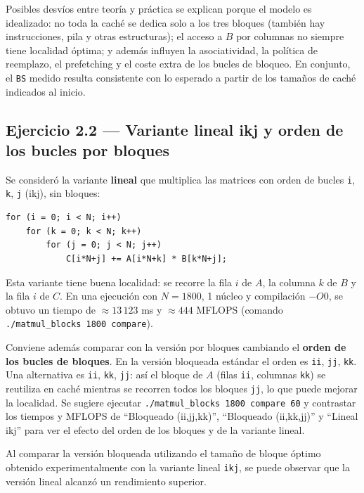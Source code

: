 \documentclass[11pt,a4paper]{article}
\begin{document}
Posibles desvíos entre teoría y práctica se explican porque el modelo es idealizado: no toda la caché se dedica solo a los tres bloques (también hay instrucciones, pila y otras estructuras); el acceso a \(B\) por columnas no siempre tiene localidad óptima; y además influyen la asociatividad, la política de reemplazo, el prefetching y el coste extra de los bucles de bloqueo. En conjunto, el \texttt{BS} medido resulta consistente con lo esperado a partir de los tamaños de caché indicados al inicio.

\subsection{Ejercicio 2.2 --- Variante lineal ikj y orden de los bucles por bloques}

Se consideró la variante \textbf{lineal} que multiplica las matrices con orden de bucles \texttt{i}, \texttt{k}, \texttt{j} (ikj), sin bloques:

\begin{lstlisting}[caption={Variante lineal ikj}]
for (i = 0; i < N; i++)
    for (k = 0; k < N; k++)
        for (j = 0; j < N; j++)
            C[i*N+j] += A[i*N+k] * B[k*N+j];
\end{lstlisting}

Esta variante tiene buena localidad: se recorre la fila \(i\) de \(A\), la columna \(k\) de \(B\) y la fila \(i\) de \(C\). En una ejecución con \(N=1800\), 1 núcleo y compilación \(-O0\), se obtuvo un tiempo de \(\approx 13\,123\) ms y \(\approx 444\) MFLOPS (comando \texttt{./matmul\_blocks 1800 compare}).

Conviene además comparar con la versión por bloques cambiando el \textbf{orden de los bucles de bloques}. En la versión bloqueada estándar el orden es \texttt{ii}, \texttt{jj}, \texttt{kk}. Una alternativa es \texttt{ii}, \texttt{kk}, \texttt{jj}: así el bloque de \(A\) (filas \texttt{ii}, columnas \texttt{kk}) se reutiliza en caché mientras se recorren todos los bloques \texttt{jj}, lo que puede mejorar la localidad. Se sugiere ejecutar \texttt{./matmul\_blocks 1800 compare 60} y contrastar los tiempos y MFLOPS de ``Bloqueado (ii,jj,kk)'', ``Bloqueado (ii,kk,jj)'' y ``Lineal ikj'' para ver el efecto del orden de los bloques y de la variante lineal.

Al comparar la versión bloqueada utilizando el tamaño de bloque óptimo obtenido experimentalmente con la variante lineal \texttt{ikj}, se puede observar que la versión lineal alcanzó un rendimiento superior.
\end{document}
